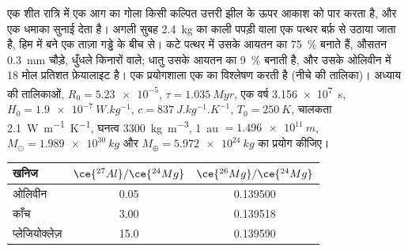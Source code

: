 \begin{problem}
\label{pb:b2:planet-formation-meteorites:1}
एक शीत रात्रि में एक आग का गोला किसी कल्पित उत्तरी झील के ऊपर आकाश को पार करता है,
और एक धमाका सुनाई देता है। अगली सुबह \qty{2.4}{kg} का काली पपड़ी वाला एक पत्थर
बर्फ़ से उठाया जाता है, हिम में बने एक ताज़ा गड्ढे के बीच से। कटे
पत्थर में  उसके आयतन का \qty{75}{\percent} बनाते हैं, औसतन \qty{0.3}{mm}
चौड़े, धुँधले किनारों वाले; धातु उसके आयतन का \qty{9}{\percent} बनाती है,
और उसके ओलिवीन में 18 मोल प्रतिशत फ़ेयालाइट है। एक प्रयोगशाला
एक  का विश्लेषण करती है (नीचे की तालिका)। अध्याय की तालिकाओं,
$R_0 = \num{5.23e-5}$, $\tau = \qty{1.035}{Myr}$, एक वर्ष \qty{3.156e7}{s},
$H_0 = \qty{1.9e-7}{W.kg^{-1}}$, $c = \qty{837}{J.kg^{-1}.K^{-1}}$,
$T_0 = \qty{250}{K}$, चालकता \qty{2.1}{W.m^{-1}.K^{-1}}, घनत्व
\qty{3300}{kg.m^{-3}}, \qty{1}{au} $= \qty{1.496e11}{m}$,
$M_\odot = \qty{1.989e30}{kg}$ और $M_\oplus = \qty{5.972e24}{kg}$ का प्रयोग कीजिए।

\begin{center}
\small
\begin{tabular}{lcc}
\hline
खनिज & $\ce{^{27}Al}/\ce{^{24}Mg}$ & $\ce{^{26}Mg}/\ce{^{24}Mg}$\\
\hline
ओलिवीन & 0.05 & \num{0.139500}\\
काँच & 3.00 & \num{0.139518}\\
प्लेजियोक्लेज़ & 15.0 & \num{0.139590}\\
\hline
\end{tabular}
\end{center}


\end{problem}
